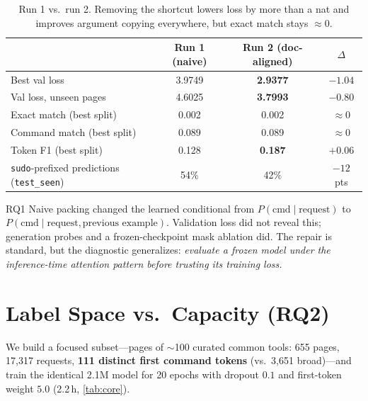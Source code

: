 \documentclass[11pt,a4paper]{article}
\newcommand{\best}[1]{\textbf{#1}}
\begin{document}
\begin{table}[t]
\centering\small
\begin{tabular}{lccc}
\toprule
 & Run 1 (naive) & Run 2 (doc-aligned) & $\Delta$ \\
\midrule
Best val loss & 3.9749 & \best{2.9377} & $-1.04$ \\
Val loss, unseen pages & 4.6025 & \best{3.7993} & $-0.80$ \\
Exact match (best split) & 0.002 & 0.002 & $\approx 0$ \\
Command match (best split) & 0.089 & 0.089 & $\approx 0$ \\
Token F1 (best split) & 0.128 & \best{0.187} & $+0.06$ \\
\texttt{sudo}-prefixed predictions (\texttt{test\_seen}) & 54\% & 42\% & $-12$ pts \\
\bottomrule
\end{tabular}
\caption{Run 1 vs.\ run 2. Removing the shortcut lowers loss by more than a
nat and improves argument copying everywhere, but exact match stays
$\approx 0$.}
\label{tab:run12}
\end{table}

\begin{finding}{RQ1}
Naive packing changed the learned conditional from
$P(\text{cmd}\mid\text{request})$ to $P(\text{cmd}\mid\text{request},
\text{previous example})$. Validation loss did not reveal this; generation
probes and a frozen-checkpoint mask ablation did. The repair is standard, but
the diagnostic generalizes: \emph{evaluate a frozen model under the
inference-time attention pattern before trusting its training loss.}
\end{finding}

\section{Label Space vs.\ Capacity (RQ2)}
\label{sec:core}

We build a focused subset---pages of $\sim$100 curated common tools: 655
pages, 17{,}317 requests, \textbf{111 distinct first command tokens}
(vs.\ 3{,}651 broad)---and train the identical 2.1M model for 20 epochs with
dropout $0.1$ and first-token weight $5.0$ (2.2\,h, \cref{tab:core}).
\end{document}
